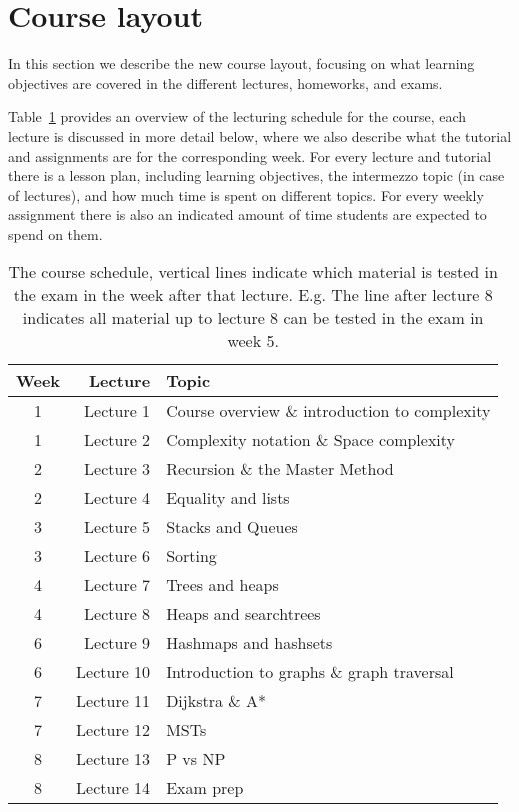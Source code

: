 \section{Course layout}
\label{sec:course_layout}

In this section we describe the new course layout, focusing on what learning objectives are covered in the different
lectures, homeworks, and exams.

Table~\ref{tab:schedule} provides an overview of the lecturing schedule for the course, each lecture is discussed in
more detail below, where we also describe what the tutorial and assignments are for the corresponding week. For every
lecture and tutorial there is a lesson plan, including learning objectives, the intermezzo topic (in case of lectures),
and how much time is spent on different topics. For every weekly assignment there is also an indicated amount of time
students are expected to spend on them.

\begin{table}[htpb]
	\centering
	\caption{The course schedule, vertical lines indicate which material is tested in the exam in the week after that
	lecture. E.g. The line after lecture 8 indicates all material up to lecture 8 can be tested in the exam in week 5.}
	\label{tab:schedule}
	\begin{tabular}{c | r | l}
		Week & Lecture & Topic \\
		\hline
		1 & Lecture 1 & Course overview \& introduction to complexity\\
		1 & Lecture 2 & Complexity notation \& Space complexity  \\
		2 & Lecture 3 & Recursion \& the Master Method\\
		2 & Lecture 4 & Equality and lists \\
		3 & Lecture 5 & Stacks and Queues\\
		3 & Lecture 6 & Sorting \\
		4 & Lecture 7 & Trees and heaps \\
		4 & Lecture 8 & Heaps and searchtrees \\
		\hline
		6 & Lecture 9 & Hashmaps and hashsets\\
		6 & Lecture 10 & Introduction to graphs \& graph traversal\\
		7 & Lecture 11 & Dijkstra \& A* \\
		7 & Lecture 12 & MSTs \\
		8 & Lecture 13 & P vs NP\\
		8 & Lecture 14 & Exam prep\\
		\hline
	\end{tabular}
\end{table}

\newpage

\newpage

\newpage

\newpage

\newpage

\newpage

\newpage

\newpage
%
%

